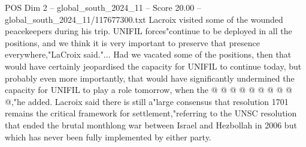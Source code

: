 \begin{textsample}{POS Dim 2 – global\_south\_2024\_11 – Score 20.00 – global\_south\_2024\_11/117677300.txt}
Lacroix visited some of the wounded peacekeepers during his trip.
UNIFIL forces"continue to be deployed in all the positions, and we think it is very important to preserve that presence everywhere,"LaCroix said."...
Had we vacated some of the positions, then that would have certainly jeopardised the capacity for UNIFIL to continue today, but probably even more importantly, that would have significantly undermined the capacity for UNIFIL to play a role tomorrow, when the @ @ @ @ @ @ @ @ @ @,"he added.
Lacroix said there is still a"large consensus that resolution 1701 remains the critical framework for settlement,"referring to the UNSC resolution that ended the brutal monthlong war between Israel and Hezbollah in 2006 but which has never been fully implemented by either party.

\end{textsample}
